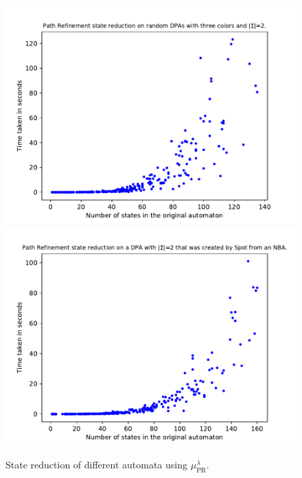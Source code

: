 \begin{figure}
\begin{minipage}{0.49\textwidth}
		\caption{State reduction of different automata using $\mu_\text{PR}^\lambda$.}
		\label{fig:pr:empirical_size_hist}
	\end{minipage}
	\hfill
	\begin{minipage}{0.49\textwidth}
		\includegraphics[page=3,height=.3\textheight]{../data/analysis/path_refinement/gendet_ap1.pdf} 
		\includegraphics[page=3,height=.3\textheight]{../data/analysis/path_refinement/detspot_ap1.pdf} 

\end{minipage}
\end{figure}
